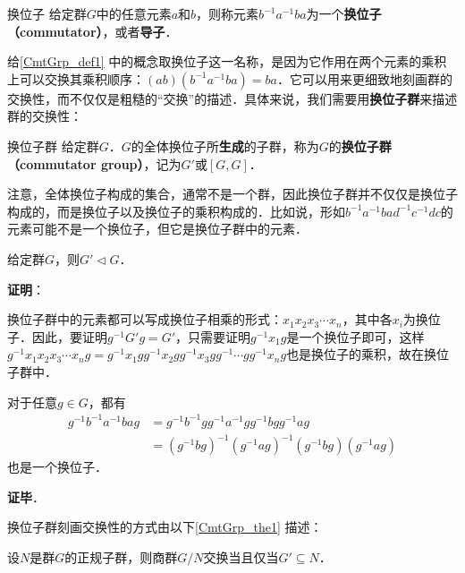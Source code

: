 


\begin{definition}{换位子}\label{CmtGrp_def1}
给定群$G$中的任意元素$a$和$b$，则称元素$b^{-1}a^{-1}ba$为一个\textbf{换位子（commutator）}，或者\textbf{导子}．
\end{definition}

给\autoref{CmtGrp_def1} 中的概念取换位子这一名称，是因为它作用在两个元素的乘积上可以交换其乘积顺序：$(ab)(b^{-1}a^{-1}ba)=ba$．它可以用来更细致地刻画群的交换性，而不仅仅是粗糙的“交换”的描述．具体来说，我们需要用\textbf{换位子群}来描述群的交换性：

\begin{definition}{换位子群}
给定群$G$．$G$的全体换位子所\textbf{生成}的子群，称为$G$的\textbf{换位子群（commutator group）}，记为$G'$或$[G, G]$．
\end{definition}

注意，全体换位子构成的集合，通常不是一个群，因此换位子群并不仅仅是换位子构成的，而是换位子以及换位子的乘积构成的．比如说，形如$b^{-1}a^{-1}bad^{-1}c^{-1}dc$的元素可能不是一个换位子，但它是换位子群中的元素．

\begin{theorem}{}
给定群$G$，则$G'\triangleleft G$．
\end{theorem}

\textbf{证明}：

换位子群中的元素都可以写成换位子相乘的形式：$x_1x_2x_3\cdots x_n$，其中各$x_i$为换位子．因此，要证明$g^{-1}G'g=G'$，只需要证明$g^{-1}x_1g$是一个换位子即可，这样$g^{-1}x_1x_2x_3\cdots x_ng=g^{-1}x_1gg^{-1}x_2gg^{-1}x_3gg^{-1}\cdots gg^{-1}x_ng$也是换位子的乘积，故在换位子群中．

对于任意$g\in G$，都有
\begin{equation}
\begin{aligned}
g^{-1}b^{-1}a^{-1}bag&=g^{-1}b^{-1}gg^{-1}a^{-1}gg^{-1}bgg^{-1}ag\\
&=(g^{-1}bg)^{-1}(g^{-1}ag)^{-1}(g^{-1}bg)(g^{-1}ag)
\end{aligned}
\end{equation}
也是一个换位子．

\textbf{证毕}．

换位子群刻画交换性的方式由以下\autoref{CmtGrp_the1} 描述：

\begin{theorem}{}\label{CmtGrp_the1}
设$N$是群$G$的正规子群，则商群$G/N$交换当且仅当$G'\subseteq N$．
\end{theorem}

